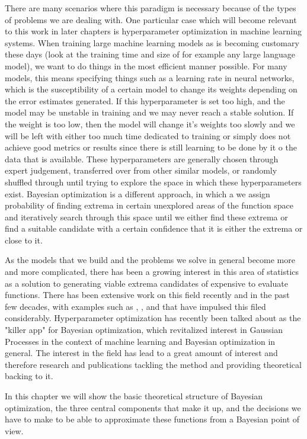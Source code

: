 There are many scenarios where this paradigm is necessary because of the types of problems we are dealing with. One particular case which will become relevant to this work in later chapters is hyperparameter optimization in machine learning systems. When training large machine learning models as is becoming customary these days (look at the training time and size of for example any large language model), we want to do things in the most efficient manner possible. For many models, this means specifying things such as a learning rate in neural networks, which is the susceptibility of a certain model to change its weights depending on the error estimates generated. If this hyperparameter is set too high, and the model may be unstable in training and we may never reach a stable solution. If the weight is too low, then the model will change it's weights too slowly and we will be left with either too much time dedicated to training or simply does not achieve good metrics or results since there is still learning to be done by it o the data that is available. These hyperparameters are generally chosen through expert judgement, transferred over from other similar models, or randomly shuffled through until trying to explore the space in which these hyperparameters exist. Bayesian optimization is a different approach, in which a we assign probability of finding extrema in certain unexplored areas of the function space and iteratively search through this space until we either find these extrema or find a suitable candidate with a certain confidence that it is either the extrema or close to it. 

As the models that we build and the problems we solve in general become more and more complicated, there has been a growing interest in this area of statistics as a solution to generating viable extrema candidates of expensive to evaluate functions. There has been extensive work on this field recently and in the past few decades, with examples such as \cite{bergstra2013hyperopt}, \cite{balandat2020botorch}, and \cite{akiba2019optuna} that have impulsed this filed considerably. Hyperparameter optimization has recently been talked about as the "killer app" for Bayesian optimization, which revitalized interest in Gaussian Processes in the context of machine learning and Bayesian optimization in general. The interest in the field has lead to a great amount of interest and therefore research and publications tackling the method and providing theoretical backing to it. 

In this chapter we will show the basic theoretical structure of Bayesian optimization, the three central components that make it up, and the decisions we have to make to be able to approximate these functions from a Bayesian point of view. 

